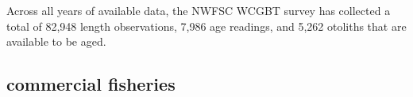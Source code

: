 \documentclass[11pt,
  english,
  letterpaper,
]{article}
\begin{document}

Across all years of available data, the NWFSC WCGBT survey has collected a total of 82,948 length observations, 7,986 age readings, and 5,262 otoliths that are available to be aged.

\leavevmode\tagmcend\tagstructend\par


\hypertarget{commercial-fisheries-34}{%
\subsection{commercial fisheries}\label{commercial-fisheries-34}}

\leavevmode\tagmcend\tagstructend


\begingroup\fontsize{10}{12}\selectfont \begingroup\fontsize{10}{12}\selectfont

\leavevmode\tagmcend\tagstructend\par
\end{document}
